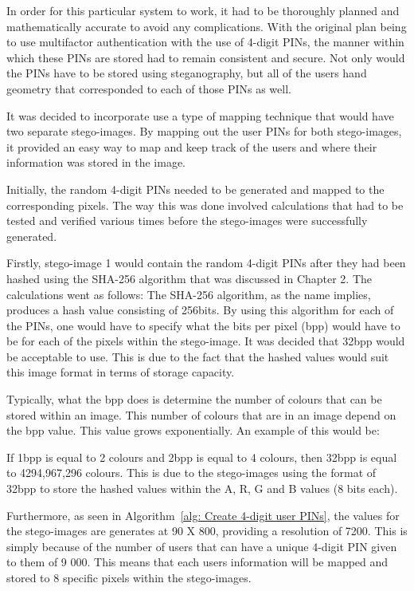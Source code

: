 In order for this particular system to work, it had to be thoroughly planned and mathematically accurate to avoid any complications. With the original plan being to use multifactor authentication with the use of 4-digit PINs, the manner within which these PINs are stored had to remain consistent and secure. Not only would the PINs have to be stored using steganography, but all of the users hand geometry that corresponded to each of those PINs as well. 

It was decided to incorporate use a type of mapping technique that would have two separate stego-images. By mapping out the user PINs for both stego-images, it provided an easy way to map and keep track of the users and where their information was stored in the image. 

Initially, the random 4-digit PINs needed to be generated and mapped to the corresponding pixels. The way this was done involved calculations that had to be tested and verified various times before the stego-images were successfully generated. 

Firstly, stego-image 1 would contain the random 4-digit PINs after they had been hashed using the SHA-256 algorithm that was discussed in Chapter 2. The calculations went as follows:
The SHA-256 algorithm, as the name implies, produces a hash value consisting of 256bits. 
By using this algorithm for each of the PINs, one would have to specify what the bits per pixel (bpp) would have to be for each of the pixels within the stego-image. It was decided that 32bpp would be acceptable to use. This is due to the fact that the hashed values would suit this image format in terms of storage capacity.

Typically, what the bpp does is determine the number of colours that can be stored within an image. This number of colours that are in an image depend on the bpp value. This value grows exponentially. An example of this would be: 

If 1bpp is equal to 2 colours and 2bpp is equal to 4 colours, then 32bpp is equal to 4294,967,296 colours. This is due to the stego-images using the format of 32bpp to store the hashed values within the A, R, G and B values (8 bits each).

Furthermore, as seen in Algorithm~\ref{alg: Create 4-digit user PINs}, the values for the stego-images are generates at 90 X 800, providing a resolution of 7200. This is simply because of the number of users that can have a unique 4-digit PIN given to them of 9 000. This means that each users information will be mapped and stored to 8 specific pixels within the stego-images. 

